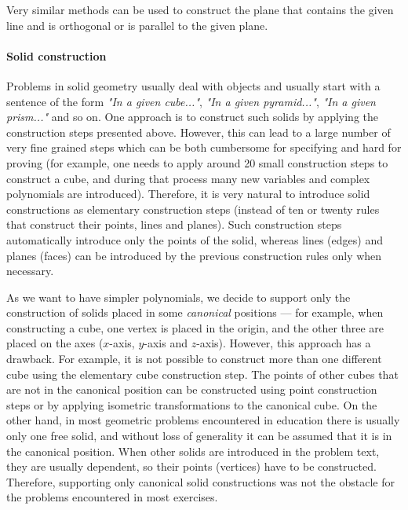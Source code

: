 \documentclass[final,1p,times,authoryear]{elsarticle}
\begin{document}

Very similar methods can be used to construct the plane that contains
the given line and is orthogonal or is parallel to the given plane.

\paragraph{Solid construction}
\label{objectconstruction}

Problems in solid geometry usually deal with objects and usually start
with a sentence of the form {\em "In a given cube..."}, {\em "In a
  given pyramid..."}, {\em "In a given prism..."} and so on. One
approach is to construct such solids by applying the construction
steps presented above. However, this can lead to a large number of
very fine grained steps which can be both cumbersome for specifying
and hard for proving (for example, one needs to apply around 20 small
construction steps to construct a cube, and during that process many
new variables and complex polynomials are introduced). Therefore, it
is very natural to introduce solid constructions as elementary
construction steps (instead of ten or twenty rules that construct
their points, lines and planes). Such construction steps automatically
introduce only the points of the solid, whereas lines (edges) and
planes (faces) can be introduced by the previous construction rules
only when necessary.

As we want to have simpler polynomials, we decide to support only the
construction of solids placed in some {\em canonical} positions ---
for example, when constructing a cube, one vertex is placed in the
origin, and the other three are placed on the axes ($x$-axis, $y$-axis
and $z$-axis). However, this approach has a drawback. For example, it
is not possible to construct more than one different cube using the
elementary cube construction step. The points of other cubes that are
not in the canonical position can be constructed using point
construction steps or by applying isometric transformations to the
canonical cube. On the other hand, in most geometric problems
encountered in education there is usually only one free solid, and
without loss of generality it can be assumed that it is in the
canonical position. When other solids are introduced in the problem
text, they are usually dependent, so their points (vertices) have to
be constructed. Therefore, supporting only canonical solid
constructions was not the obstacle for the problems encountered in
most exercises.
\end{document}
